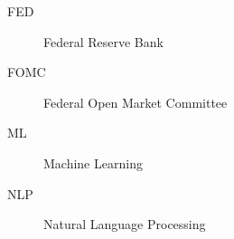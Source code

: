 %
\begin{description}
	\item[FED] Federal Reserve Bank
	\item[FOMC] Federal Open Market Committee
	\item[ML] Machine Learning
	\item[NLP] Natural Language Processing
\end{description}